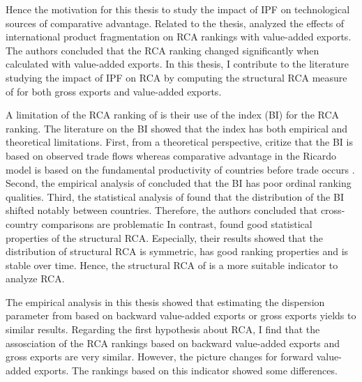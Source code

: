  \par %
Hence the motivation for this thesis to study the impact of IPF on technological sources of comparative advantage.
 Related to the thesis, \textcite{Koopman} analyzed the effects of international product fragmentation on RCA rankings with  value-added
exports. The authors concluded that the RCA ranking changed significantly when calculated with value-added exports.
In this thesis, I contribute to the literature studying the impact of IPF on RCA  by computing the structural RCA measure of  \textcite{costinot} for both gross exports and value-added exports.
\par %
A limitation of the RCA ranking of  \textcite{Koopman} is their use of the \textcite{Balassa} index (BI) for the RCA ranking.
The literature on the BI showed that the index has both empirical and theoretical limitations.
 First, from a theoretical perspective,\textcite{leromain2014,} critize that the BI is based on observed trade flows whereas comparative advantage in the Ricardo model is based on the fundamental productivity of countries before trade occurs \parencite{leromain2014}.  Second, the empirical analysis of \textcite{yeats} concluded that the BI has poor ordinal ranking qualities. Third, the statistical analysis of \textcite{hinloopen2001} found that the distribution of the BI shifted notably between countries. Therefore, the authors concluded
that cross-country comparisons are problematic%
In contrast,  \textcite{Leromain} found good statistical properties of the structural RCA.
 Especially, their results showed that the distribution of structural RCA is symmetric, has good ranking properties and is stable over time.
  Hence, the structural RCA of \textcite{costinot} is a more suitable indicator to analyze RCA.  \par
The empirical analysis in this thesis showed that estimating the dispersion parameter from \textcite{costinot} based on backward value-added exports or gross exports yields to similar results. 
Regarding the first hypothesis about RCA, I find that the assosciation of the RCA rankings based on backward value-added exports and gross exports are very similar. However, the picture changes for forward value-added exports. The rankings based on this indicator showed some differences. 
